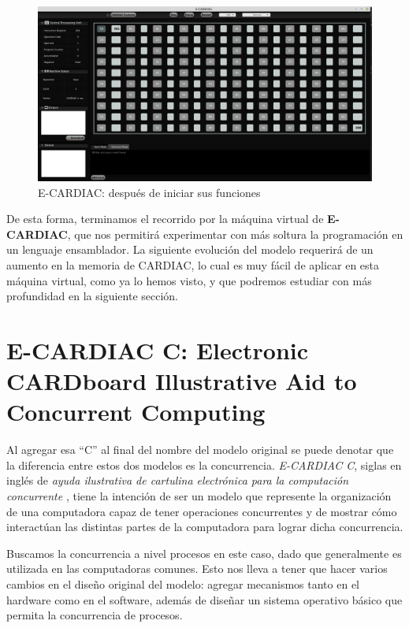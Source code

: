 \documentclass[letterpaper,12pt,oneside]{book}
\begin{document}
	\begin{figure}[H]
			\includegraphics[scale=0.35]{media/ECARDIAC/ECARDIAC_P2.png}
			\caption{E-CARDIAC: después de iniciar sus funciones}
			\label{fig:enceCardiac}
			
	\end{figure}
	
	
	De esta forma, terminamos el recorrido por la máquina virtual de \textbf{E-CARDIAC}, que nos permitirá experimentar con más soltura la programación 
	en un
	lenguaje ensamblador. La siguiente evolución del modelo requerirá de un aumento en la memoria de CARDIAC, lo cual es muy fácil
	de aplicar en esta  máquina virtual, como ya lo hemos visto, y que podremos estudiar con más profundidad en la siguiente
	sección.


	\clearpage	
		
	\section{E-CARDIAC C: Electronic CARDboard Illustrative Aid to Concurrent Computing}
		
	Al agregar esa ``C'' al final del nombre del modelo original
	se puede denotar que la diferencia entre estos dos modelos es la concurrencia. \textit{E-CARDIAC C}, siglas en inglés de 
	\textit{ayuda ilustrativa de cartulina electrónica para la computación concurrente}	
	, tiene la intención de ser un modelo que represente la organización de una computadora
	capaz de tener operaciones concurrentes
	y de mostrar cómo interactúan las distintas partes de la computadora para lograr dicha concurrencia.
 
    Buscamos la concurrencia a nivel procesos
	en este caso, dado que generalmente es utilizada en las computadoras comunes. Esto nos lleva a tener que hacer varios cambios en el diseño original
	del modelo: agregar mecanismos tanto en el hardware como en el software, además de diseñar un sistema operativo básico que permita la concurrencia 
	de procesos.
	
\end{document}
